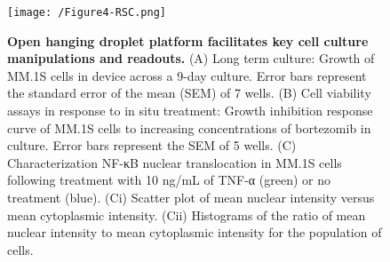 \begin{figure}[ht] %
\centering
\texttt{[image: /Figure4-RSC.png]}
\caption{\textbf{Open hanging droplet platform facilitates key cell culture manipulations and readouts.} (A) Long term culture: Growth of MM.1S cells in device across a 9-day culture. Error bars represent the standard error of the mean (SEM) of 7 wells. (B) Cell viability assays in response to in situ treatment: Growth inhibition response curve of MM.1S cells to increasing concentrations of bortezomib in culture. Error bars represent the SEM of 5 wells. (C) Characterization NF-κB nuclear translocation in MM.1S cells following treatment with 10 ng/mL of TNF-α (green) or no treatment (blue). (Ci) Scatter plot of mean nuclear intensity versus mean cytoplasmic intensity. (Cii) Histograms of the ratio of mean nuclear intensity to mean cytoplasmic intensity for the population of cells.}
\label{figure:Fig4}
\end{figure}

